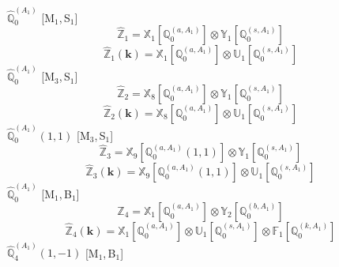 \documentclass[fleqn,10pt,landscape]{article}
\begin{document}
\begin{itemize}
\vspace{4mm}
\noindent {} $\,\,\,\hat{\mathbb{Q}}_{0}^{(A_{1})}$ [M$_{1}$,\,S$_{1}$]
\begin{dmath*}
\hat{\mathbb{Z}}_{1}=\mathbb{X}_{1}[\mathbb{Q}_{0}^{(a,A_{1})}] \otimes\mathbb{Y}_{1}[\mathbb{Q}_{0}^{(s,A_{1})}]
\end{dmath*}
\begin{dmath*}
\hat{\mathbb{Z}}_{1}(\bm{k})=\mathbb{X}_{1}[\mathbb{Q}_{0}^{(a,A_{1})}] \otimes\mathbb{U}_{1}[\mathbb{Q}_{0}^{(s,A_{1})}]
\end{dmath*}
\vspace{4mm}
\noindent {} $\,\,\,\hat{\mathbb{Q}}_{0}^{(A_{1})}$ [M$_{3}$,\,S$_{1}$]
\begin{dmath*}
\hat{\mathbb{Z}}_{2}=\mathbb{X}_{8}[\mathbb{Q}_{0}^{(a,A_{1})}] \otimes\mathbb{Y}_{1}[\mathbb{Q}_{0}^{(s,A_{1})}]
\end{dmath*}
\begin{dmath*}
\hat{\mathbb{Z}}_{2}(\bm{k})=\mathbb{X}_{8}[\mathbb{Q}_{0}^{(a,A_{1})}] \otimes\mathbb{U}_{1}[\mathbb{Q}_{0}^{(s,A_{1})}]
\end{dmath*}
\vspace{4mm}
\noindent {} $\,\,\,\hat{\mathbb{Q}}_{0}^{(A_{1})}(1,1)$ [M$_{3}$,\,S$_{1}$]
\begin{dmath*}
\hat{\mathbb{Z}}_{3}=\mathbb{X}_{9}[\mathbb{Q}_{0}^{(a,A_{1})}(1,1)] \otimes\mathbb{Y}_{1}[\mathbb{Q}_{0}^{(s,A_{1})}]
\end{dmath*}
\begin{dmath*}
\hat{\mathbb{Z}}_{3}(\bm{k})=\mathbb{X}_{9}[\mathbb{Q}_{0}^{(a,A_{1})}(1,1)] \otimes\mathbb{U}_{1}[\mathbb{Q}_{0}^{(s,A_{1})}]
\end{dmath*}
\vspace{4mm}
\noindent {} $\,\,\,\hat{\mathbb{Q}}_{0}^{(A_{1})}$ [M$_{1}$,\,B$_{1}$]
\begin{dmath*}
\hat{\mathbb{Z}}_{4}=\mathbb{X}_{1}[\mathbb{Q}_{0}^{(a,A_{1})}] \otimes\mathbb{Y}_{2}[\mathbb{Q}_{0}^{(b,A_{1})}]
\end{dmath*}
\begin{dmath*}
\hat{\mathbb{Z}}_{4}(\bm{k})=\mathbb{X}_{1}[\mathbb{Q}_{0}^{(a,A_{1})}] \otimes\mathbb{U}_{1}[\mathbb{Q}_{0}^{(s,A_{1})}] \otimes\mathbb{F}_{1}[\mathbb{Q}_{0}^{(k,A_{1})}]
\end{dmath*}
\vspace{4mm}
\noindent {} $\,\,\,\hat{\mathbb{Q}}_{4}^{(A_{1})}(1,-1)$ [M$_{1}$,\,B$_{1}$]
\begin{dmath*}

\end{dmath*}
\end{itemize}
\end{document}
